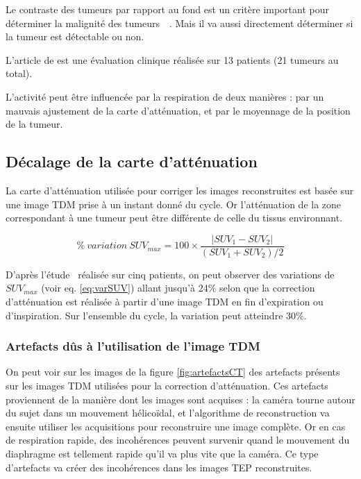 Le contraste des tumeurs par rapport au fond est un critère important pour déterminer la malignité des tumeurs~\cite{dimitrakopoulou2002role}~\cite{krak2005effects}. Mais il va aussi directement déterminer si la tumeur est détectable ou non.

L'article de \cite{GuopingChang2010Implementation} est une évaluation clinique réalisée sur 13 patients (21 tumeurs au total).

L'activité peut être influencée par la respiration de deux manières : par un mauvais ajustement de la carte d'atténuation, et par le moyennage de la position de la tumeur.

\subsection{Décalage de la carte d'atténuation}

La carte d'atténuation utilisée pour corriger les images reconstruites est basée sur une image TDM prise à un instant donné du cycle. Or l'atténuation de la zone correspondant à une tumeur peut être différente de celle du tissus environnant.

\begin{equation}
\label{eq:varSUV}
 \%~variation~SUV_{max} = 100 \times \frac{ | SUV_1 - SUV_2 | }{ (SUV_1 + SUV_2) / 2 }
\end{equation}

D'après l'étude~\cite{erdi2004ct} réalisée sur cinq patients, on peut observer des variations de $SUV_{max}$ (voir eq. \ref{eq:varSUV}) allant jusqu'à 24\% selon que la correction d'atténuation est réalisée à partir d'une image TDM en fin d'expiration ou d'inspiration. Sur l'ensemble du cycle, la variation peut atteindre 30\%.


\subsubsection{Artefacts dûs à l'utilisation de l'image TDM}

On peut voir sur les images de la figure \ref{fig:artefactsCT} des artefacts présents sur les images TDM utilisées pour la correction d'atténuation. Ces artefacts proviennent de la manière dont les images sont acquises : la caméra tourne autour du sujet dans un mouvement hélicoïdal, et l'algorithme de reconstruction va ensuite utiliser les acquisitions pour reconstruire une image complète. Or en cas de respiration rapide, des incohérences peuvent survenir quand le mouvement du diaphragme est tellement rapide qu'il va plus vite que la caméra. Ce type d'artefacts va créer des incohérences dans les images TEP reconstruites.

